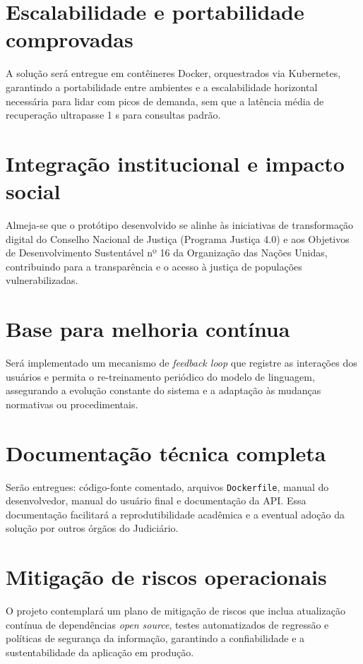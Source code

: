\section{Escalabilidade e portabilidade comprovadas}
A solução será entregue em contêineres Docker, orquestrados via Kubernetes, garantindo a portabilidade entre ambientes e a escalabilidade horizontal necessária para lidar com picos de demanda, sem que a latência média de recuperação ultrapasse 1 s para consultas padrão.

\section{Integração institucional e impacto social}
Almeja-se que o protótipo desenvolvido se alinhe às iniciativas de transformação digital do Conselho Nacional de Justiça (Programa Justiça 4.0) e aos Objetivos de Desenvolvimento Sustentável nº 16 da Organização das Nações Unidas, contribuindo para a transparência e o acesso à justiça de populações vulnerabilizadas.

\section{Base para melhoria contínua}
Será implementado um mecanismo de \emph{feedback loop} que registre as interações dos usuários e permita o re-treinamento periódico do modelo de linguagem, assegurando a evolução constante do sistema e a adaptação às mudanças normativas ou procedimentais.

\section{Documentação técnica completa}
Serão entregues: código-fonte comentado, arquivos \texttt{Dockerfile}, manual do desenvolvedor, manual do usuário final e documentação da API. Essa documentação facilitará a reprodutibilidade acadêmica e a eventual adoção da solução por outros órgãos do Judiciário.

\section{Mitigação de riscos operacionais}
O projeto contemplará um plano de mitigação de riscos que inclua atualização contínua de dependências \emph{open source}, testes automatizados de regressão e políticas de segurança da informação, garantindo a confiabilidade e a sustentabilidade da aplicação em produção.


